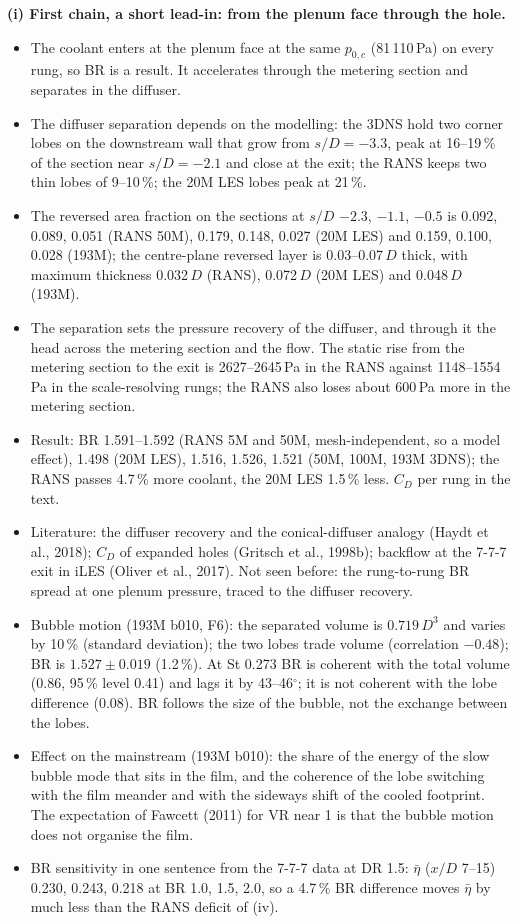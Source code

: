 \documentclass[10pt]{article}
\begin{document}
\textbf{(i) First chain, a short lead-in: from the plenum face through the hole.}
\begin{itemize}
\item The coolant enters at the plenum face at the same $p_{0,c}$ (81\,110\,Pa) on every rung, so BR is a
  result. It accelerates through the metering section and separates in the diffuser.
\item The diffuser separation depends on the modelling: the 3DNS hold two corner lobes on the downstream wall
  that grow from $s/D=-3.3$, peak at 16--19\,\% of the section near $s/D=-2.1$ and close at the exit; the RANS
  keeps two thin lobes of 9--10\,\%; the 20M LES lobes peak at 21\,\%.
\item The reversed area fraction on the sections at $s/D$ $-2.3$, $-1.1$, $-0.5$ is 0.092, 0.089, 0.051 (RANS
  50M), 0.179, 0.148, 0.027 (20M LES) and 0.159, 0.100, 0.028 (193M); the centre-plane reversed layer is
  0.03--0.07\,$D$ thick, with maximum thickness 0.032\,$D$ (RANS), 0.072\,$D$ (20M LES) and 0.048\,$D$ (193M).
\item The separation sets the pressure recovery of the diffuser, and through it the head across the metering
  section and the flow. The static rise from the metering section to the exit is 2627--2645\,Pa in the RANS
  against 1148--1554\,Pa in the scale-resolving rungs; the RANS also loses about 600\,Pa more in the metering
  section.
\item Result: BR 1.591--1.592 (RANS 5M and 50M, mesh-independent, so a model effect), 1.498 (20M LES), 1.516,
  1.526, 1.521 (50M, 100M, 193M 3DNS); the RANS passes 4.7\,\% more coolant, the 20M LES 1.5\,\% less. $C_D$ per
  rung in the text.
\item Literature: the diffuser recovery and the conical-diffuser analogy (Haydt et al., 2018); $C_D$ of
  expanded holes (Gritsch et al., 1998b); backflow at the 7-7-7 exit in iLES (Oliver et al., 2017). Not seen
  before: the rung-to-rung BR spread at one plenum pressure, traced to the diffuser recovery.
\item Bubble motion (193M b010, F6): the separated volume is $0.719\,D^3$ and varies by 10\,\% (standard deviation); the two lobes
  trade volume (correlation $-0.48$); BR is $1.527\pm0.019$ (1.2\,\%). At St 0.273 BR is coherent with the total
  volume (0.86, 95\,\% level 0.41) and lags it by 43--46$^\circ$; it is not coherent with the lobe difference
  (0.08). BR follows the size of the bubble, not the exchange between the lobes.
\item Effect on the mainstream (193M b010): the share of the energy of the slow bubble mode that sits in the
  film, and the coherence of the lobe switching with the film meander and with the sideways shift of the cooled
  footprint. The expectation of Fawcett (2011) for VR near 1 is that the bubble motion does not organise the
  film.
\item BR sensitivity in one sentence from the 7-7-7 data at DR 1.5: $\bar\eta$ ($x/D$ 7--15) 0.230, 0.243, 0.218
  at BR 1.0, 1.5, 2.0, so a 4.7\,\% BR difference moves $\bar\eta$ by much less than the RANS deficit of (iv).
\end{itemize}
\end{document}
